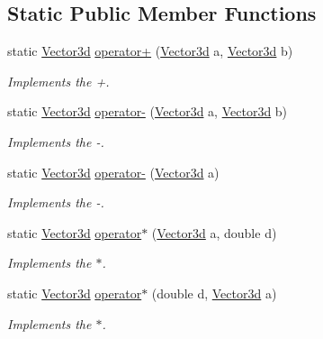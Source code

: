\subsection*{Static Public Member Functions}
\begin{DoxyCompactItemize}
\item 
static \hyperlink{struct_unity_engine_1_1_vector3d}{Vector3d} \hyperlink{struct_unity_engine_1_1_vector3d_af39f26741114eb1a2bc568575e023aff}{operator+} (\hyperlink{struct_unity_engine_1_1_vector3d}{Vector3d} a, \hyperlink{struct_unity_engine_1_1_vector3d}{Vector3d} b)
\begin{DoxyCompactList}\small\item\em Implements the +. \end{DoxyCompactList}\item 
static \hyperlink{struct_unity_engine_1_1_vector3d}{Vector3d} \hyperlink{struct_unity_engine_1_1_vector3d_aba72953258f8018bcc9add86691626d4}{operator-\/} (\hyperlink{struct_unity_engine_1_1_vector3d}{Vector3d} a, \hyperlink{struct_unity_engine_1_1_vector3d}{Vector3d} b)
\begin{DoxyCompactList}\small\item\em Implements the -\/. \end{DoxyCompactList}\item 
static \hyperlink{struct_unity_engine_1_1_vector3d}{Vector3d} \hyperlink{struct_unity_engine_1_1_vector3d_acad45715104521282736f9b6e46f9065}{operator-\/} (\hyperlink{struct_unity_engine_1_1_vector3d}{Vector3d} a)
\begin{DoxyCompactList}\small\item\em Implements the -\/. \end{DoxyCompactList}\item 
static \hyperlink{struct_unity_engine_1_1_vector3d}{Vector3d} \hyperlink{struct_unity_engine_1_1_vector3d_aaa34740e2dc031ee004732b71a15e8c7}{operator$\ast$} (\hyperlink{struct_unity_engine_1_1_vector3d}{Vector3d} a, double d)
\begin{DoxyCompactList}\small\item\em Implements the $\ast$. \end{DoxyCompactList}\item 
static \hyperlink{struct_unity_engine_1_1_vector3d}{Vector3d} \hyperlink{struct_unity_engine_1_1_vector3d_a41bbe6bedd730d92560d0cbcb6c6fd16}{operator$\ast$} (double d, \hyperlink{struct_unity_engine_1_1_vector3d}{Vector3d} a)
\begin{DoxyCompactList}\small\item\em Implements the $\ast$. \end{DoxyCompactList}\item 

\end{DoxyCompactItemize}
